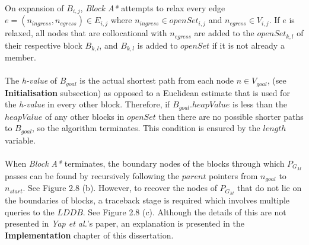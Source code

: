 \documentclass[12pt,notitlepage]{report}
\begin{document}
\\
\noindent
On expansion of $B_{i,j}$, {\em Block A*} attempts to relax every edge $e=(n_{ingress},n_{egress}) \in E_{i,j}$ where $n_{ingress} \in openSet_{i,j}$ and $n_{egress} \in V_{i,j}$. If $e$ is relaxed, all nodes that are collocational with $n_{egress}$ are added to the $openSet_{k,l}$ of their respective block $B_{k,l}$, and $B_{k,l}$ is added to $openSet$ if it is not already a member. \\

\\
\noindent
The {\em h-value} of $B_{goal}$ is the actual shortest path from each node $n \in V_{goal}$, (see {\bfseries Initialisation} subsection) as opposed to a Euclidean estimate that is used for the {\em h-value} in every other block. Therefore, if $B_{goal}.heapValue$ is less than the $heapValue$ of any other blocks in $openSet$ then there are no possible shorter paths to $B_{goal}$, so the algorithm terminates. This condition is ensured by the $length$ variable.\\

\\
\noindent
When {\em Block A*} terminates, the boundary nodes of the blocks through which $P_{G_{M}}$ passes can be found by recursively following the $parent$ pointers from $n_{goal}$ to $n_{start}$. See Figure 2.8 (b). However, to recover the nodes of $P_{G_{M}}$ that do not lie on the boundaries of blocks, a traceback stage is required which involves multiple queries to the $LDDB$. See Figure 2.8 (c). Although the details of this are not presented in {\em Yap et al.}'s paper, an explanation is presented in the {\bfseries Implementation} chapter of this dissertation.\\
\end{document}

